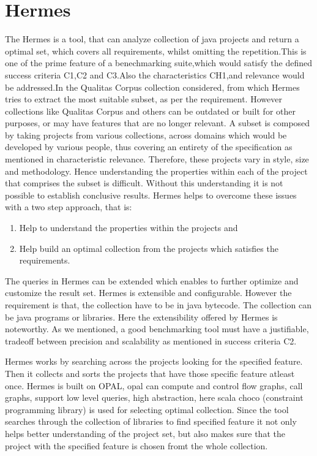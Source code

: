 \documentclass[authoryear,preprint]{sigplanconf}
\begin{document}
\section{Hermes}
\label{sec:sec_hermes}
The Hermes\cite{Reif:2017:HAC:3088515.3088523} is a tool, that can analyze collection of java projects and return a optimal set, which covers all requirements, whilst omitting the repetition.This is one of the prime feature of a benechmarking suite,which would satisfy the defined success criteria C1,C2 and C3.Also the characteristics CH1,and relevance would be addressed.In the Qualitas Corpus\cite{5693210} \cite{Dingsoyr:2013:RCL:2507288.2507322} collection considered, from which Hermes tries to extract the most suitable subset, as per the requirement. However collections like Qualitas Corpus and others can be outdated or built for other purposes, or may have features that are no longer relevant. A subset is composed by taking projects from various collections, across domains which would be developed by various people, thus covering an entirety of the specification as mentioned in characteristic relevance.  Therefore, these projects vary in style, size and methodology. Hence understanding the properties within each of the project that comprises the subset is difficult. Without this understanding it is not possible to establish conclusive results. Hermes helps to overcome these issues with a two step approach, that is:

\begin{enumerate}
	\item Help to understand the properties within the projects and 
	\item Help build an optimal collection from the projects which satisfies the requirements.
\end{enumerate}

The queries in Hermes can be extended which enables to further optimize and customize the result set. Hermes is extensible and configurable. However the requirement is that, the collection have to be in java bytecode. The collection can be java programs or libraries. Here the extensibility offered by Hermes is noteworthy. As we mentioned, a good benchmarking tool must have a justifiable, tradeoff between precision and scalability as mentioned in success criteria C2. 

Hermes works by searching across the projects looking for the specified feature. Then it collects and sorts the projects that have those specific feature atleast once. Hermes is built on OPAL, opal can compute and control flow graphs, call graphs, support low level queries, high abstraction, here scala choco (constraint programming library) is used for selecting optimal collection. Since the tool searches through the collection of libraries to find specified feature it not only helps better understanding of the project set, but also makes sure that the project with the specified feature is chosen fromt the whole collection.
\end{document}
